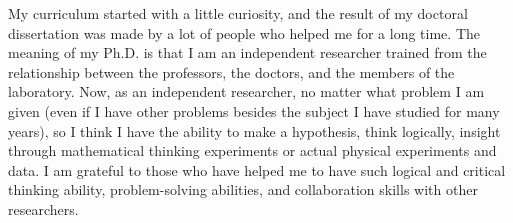 


My curriculum started with a little curiosity, and the result of my doctoral dissertation was made by a lot of people who helped me for a long time. The meaning of my Ph.D. is that I am an independent researcher trained from the relationship between the professors, the doctors, and the members of the laboratory. Now, as an independent researcher, no matter what problem I am given (even if I have other problems besides the subject I have studied for many years), so I think I have the ability to make a hypothesis, think logically, insight through mathematical thinking experiments or actual physical experiments and data. I am grateful to those who have helped me to have such logical and critical thinking ability, problem-solving abilities, and collaboration skills with other researchers. 

